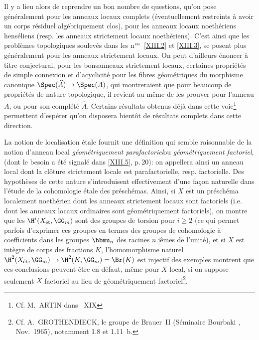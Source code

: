 Il y a lieu alors de reprendre un bon nombre de questions, qu'on pose g\'en\'eralement pour les anneaux locaux complets (\'eventuellement restreints \`a avoir un corps r\'esiduel alg\'ebriquement clos), pour les anneaux locaux noeth\'eriens hens\'eliens (resp. les anneaux strictement locaux noeth\'eriens). C'est ainsi que les probl\`emes topologiques soulev\'es dans les n$^{\textup{os}}$~\ref{XIII.2} et \ref{XIII.3}, se posent plus g\'en\'eralement pour les anneaux strictement locaux. On peut d'ailleurs \'enoncer \`a titre conjectural, pour les \og bons\fg anneaux strictement locaux, certaines propri\'et\'es de simple connexion et d'acyclicit\'e pour les fibres g\'eom\'etriques du morphisme canonique $\Spec(\widehat{A})\to\Spec(A)$, qui montreraient que pour beaucoup de propri\'et\'es de nature \og topologique\fg, il revient au m\^eme de les prouver pour l'anneau $A$, ou pour son compl\'et\'e $\widehat{A}$. Certains r\'esultats obtenus d\'ej\`a dans cette voie\footnote{Cf. M.\, ARTIN dans ~XIX} permettent d'esp\'erer qu'on disposera bient\^{o}t de r\'esultats complets dans cette direction.

\label{commpara}%
La notion de localisation \'etale fournit une d\'efinition qui semble raisonnable de la notion d'anneau local \og \emph{géométriquement parafactoriel}\fg ou \og \emph{géométriquement factoriel}\fg, (dont le besoin a \'et\'e signal\'e dans \numero\ref{XIII.5}, p.\,20): on appellera ainsi un anneau local dont la cl\^{o}ture strictement locale est parafactorielle, resp. factorielle. Des hypoth\`eses de cette nature s'introduisent effectivement d'une fa\c con naturelle dans l'\'etude de la cohomologie \'etale des pr\'esch\'emas. Ainsi, si $X$ est un pr\'esch\'ema localement noeth\'erien dont les anneaux strictement locaux sont factoriels (i.e. dont les anneaux locaux ordinaires sont \og g\'eom\'etriquement factoriels{\fg}), on montre que les $\H^i(X_{{\textup{ét}}}, \GG_m)$ sont des groupes de torsion pour $i\geq 2$ (ce qui permet parfois d'exprimer ces groupes en termes des groupes de cohomologie \`a coefficients dans les groupes $\bbmu_n$ des racines $n$.i{\^emes} de l'unit\'e), et si $X$ est int\`egre de corps des fractions $K$, l'homomorphisme naturel $\H^2(X_{{\textup{ét}}}, \GG_m)\to\H^2(K, \GG_m)=\Br(K)$ est injectif des exemples montrent que ces conclusions peuvent \^etre en d\'efaut, m\^eme pour $X$ local, si on suppose seulement $X$ factoriel au lieu de g\'eom\'etriquement factoriel\footnote{Cf. A.\, GROTHENDIECK, le groupe de Brauer~II (S\'eminaire Bourbaki , Nov.~1965), notamment 1.8 et 1.11~b.}.

